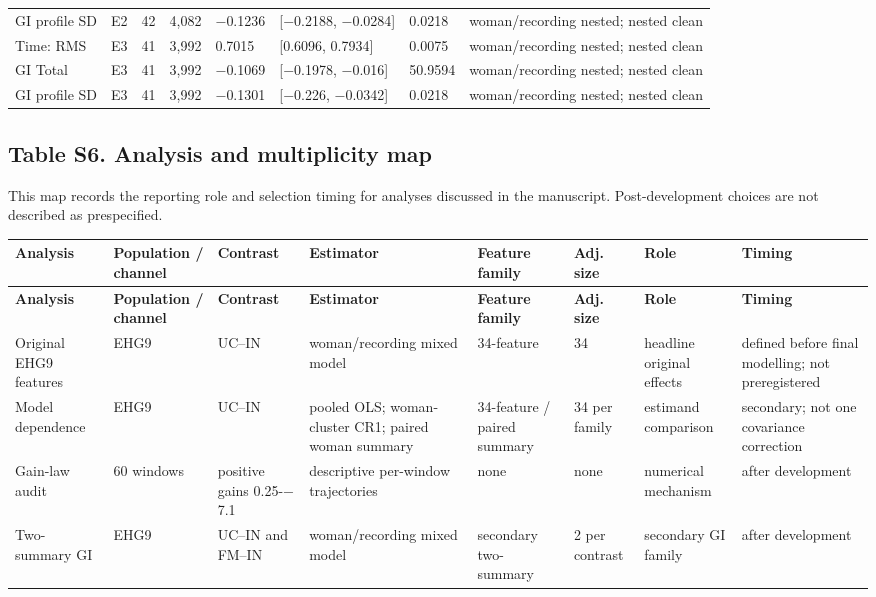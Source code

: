 \documentclass[10pt]{article}
\begin{document}
\begin{landscape}
\begin{longtable}{p{3.3cm}p{1.5cm}p{1.2cm}p{1.4cm}p{1.5cm}p{3.0cm}p{1.5cm}p{4.0cm}}
GI profile SD & E2 & 42 & 4,082 & $-$0.1236 & [$-$0.2188, $-$0.0284] & 0.0218 & woman/recording nested; nested clean \\
Time: RMS & E3 & 41 & 3,992 & 0.7015 & [0.6096, 0.7934] & 0.0075 & woman/recording nested; nested clean \\
GI Total & E3 & 41 & 3,992 & $-$0.1069 & [$-$0.1978, $-$0.016] & 50.9594 & woman/recording nested; nested clean \\
GI profile SD & E3 & 41 & 3,992 & $-$0.1301 & [$-$0.226, $-$0.0342] & 0.0218 & woman/recording nested; nested clean \\
\bottomrule
\end{longtable}
\end{landscape}

\clearpage
\begin{landscape}
\section*{Table S6. Analysis and multiplicity map}\label{tab:s6_multiplicity_map}
This map records the reporting role and selection timing for analyses discussed in the manuscript. Post-development choices are not described as prespecified.
\begin{longtable}{p{3.0cm}p{2.7cm}p{2.2cm}p{3.3cm}p{2.7cm}p{1.5cm}p{3.2cm}p{3.3cm}}
\toprule
\textbf{Analysis} & \textbf{Population / channel} & \textbf{Contrast} & \textbf{Estimator} & \textbf{Feature family} & \textbf{Adj. size} & \textbf{Role} & \textbf{Timing} \\
\midrule
\endfirsthead
\toprule
\textbf{Analysis} & \textbf{Population / channel} & \textbf{Contrast} & \textbf{Estimator} & \textbf{Feature family} & \textbf{Adj. size} & \textbf{Role} & \textbf{Timing} \\
\midrule
\endhead
Original EHG9 features & EHG9 & UC--IN & woman/recording mixed model & 34-feature & 34 & headline original effects & defined before final modelling; not preregistered \\
Model dependence & EHG9 & UC--IN & pooled OLS; woman-cluster CR1; paired woman summary & 34-feature / paired summary & 34 per family & estimand comparison & secondary; not one covariance correction \\
Gain-law audit & 60 windows & positive gains 0.25-$-$7.1 & descriptive per-window trajectories & none & none & numerical mechanism & after development \\
Two-summary GI & EHG9 & UC--IN and FM--IN & woman/recording mixed model & secondary two-summary & 2 per contrast & secondary GI family & after development \\

\end{longtable}
\end{landscape}
\end{document}
